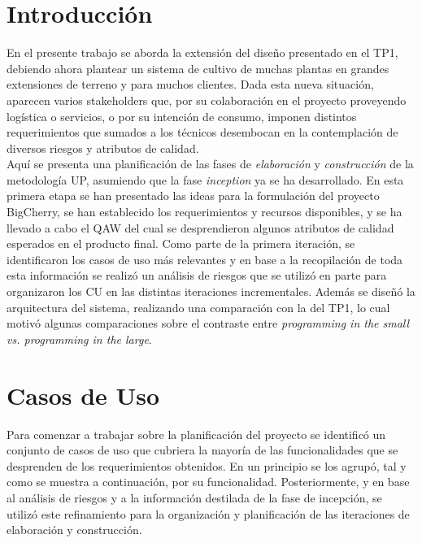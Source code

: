 \section{Introducción}

En el presente trabajo se aborda la extensión del diseño presentado en el TP1, debiendo ahora plantear un sistema de cultivo de muchas plantas en grandes extensiones de terreno y para muchos clientes. Dada esta nueva situación, aparecen varios stakeholders que, por su colaboración en el proyecto proveyendo logística o servicios, o por su intención de consumo, imponen distintos requerimientos que sumados a los técnicos desembocan en la contemplación de diversos riesgos y atributos de calidad.\\
\indent Aquí se presenta una planificación de las fases de \textit{elaboración} y \textit{construcción} de la metodología UP, asumiendo que la fase \textit{inception} ya se ha desarrollado. En esta primera etapa se han presentado las ideas para la formulación del proyecto BigCherry, se han establecido los requerimientos y recursos disponibles, y se ha llevado a cabo el QAW del cual se desprendieron algunos atributos de calidad esperados en el producto final. Como parte de la primera iteración, se identificaron los casos de uso más relevantes y en base a la recopilación de toda esta información se realizó un análisis de riesgos que se utilizó en parte para organizaron los CU en las distintas iteraciones incrementales. Además se diseñó la arquitectura del sistema, realizando una comparación con la del TP1, lo cual motivó algunas comparaciones sobre el contraste entre \textit{programming in the small vs. programming in the large}. 

\section{Casos de Uso}

Para comenzar a trabajar sobre la planificación del proyecto se identificó un conjunto de casos de uso que cubriera la mayoría de las funcionalidades que se desprenden de los requerimientos obtenidos. En un principio se los agrupó, tal y como se muestra a continuación, por su funcionalidad. Posteriormente, y en base al análisis de riesgos y a la información destilada de la fase de incepción, se utilizó este refinamiento para la organización y planificación de las iteraciones de elaboración y construcción.

